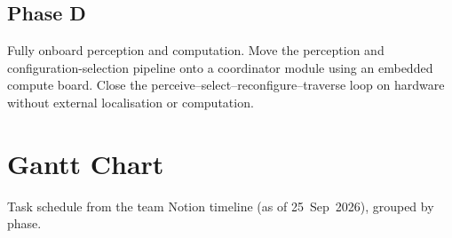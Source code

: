 \documentclass[12pt,a4paper]{article}
\begin{document}
\subsection{Phase D}
Fully onboard perception and computation. Move the perception and
configuration-selection pipeline onto a coordinator module using an embedded
compute board. Close the perceive--select--reconfigure--traverse loop on
hardware without external localisation or computation.

\clearpage
\section{Gantt Chart}
\label{sec:gantt}

Task schedule from the team Notion timeline (as of 25~Sep~2026), grouped by phase.
\end{document}
